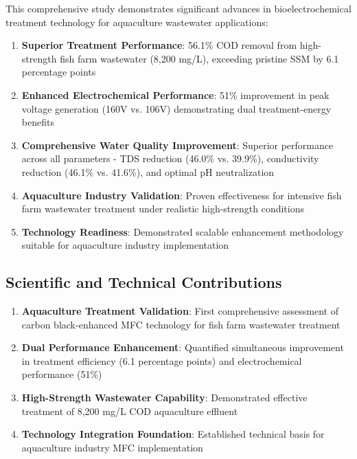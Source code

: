 \documentclass[12pt,a4paper]{article}
\begin{document}
This comprehensive study demonstrates significant advances in bioelectrochemical treatment technology for aquaculture wastewater applications:

\begin{enumerate}
    \item \textbf{Superior Treatment Performance}: 56.1\% COD removal from high-strength fish farm wastewater (8,200 mg/L), exceeding pristine SSM by 6.1 percentage points
    
    \item \textbf{Enhanced Electrochemical Performance}: 51\% improvement in peak voltage generation (160V vs. 106V) demonstrating dual treatment-energy benefits
    
    \item \textbf{Comprehensive Water Quality Improvement}: Superior performance across all parameters - TDS reduction (46.0\% vs. 39.9\%), conductivity reduction (46.1\% vs. 41.6\%), and optimal pH neutralization
    
    \item \textbf{Aquaculture Industry Validation}: Proven effectiveness for intensive fish farm wastewater treatment under realistic high-strength conditions
    
    \item \textbf{Technology Readiness}: Demonstrated scalable enhancement methodology suitable for aquaculture industry implementation
\end{enumerate}

\subsection{Scientific and Technical Contributions}

\begin{enumerate}
    \item \textbf{Aquaculture Treatment Validation}: First comprehensive assessment of carbon black-enhanced MFC technology for fish farm wastewater treatment
    
    \item \textbf{Dual Performance Enhancement}: Quantified simultaneous improvement in treatment efficiency (6.1 percentage points) and electrochemical performance (51\%)
    
    \item \textbf{High-Strength Wastewater Capability}: Demonstrated effective treatment of 8,200 mg/L COD aquaculture effluent
    
    \item \textbf{Technology Integration Foundation}: Established technical basis for aquaculture industry MFC implementation
\end{enumerate}
\end{document}
